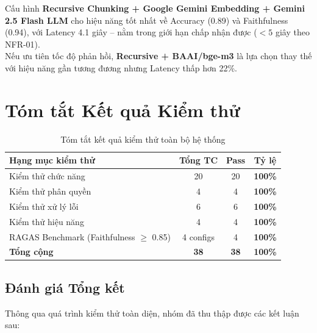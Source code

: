 \begin{tcolorbox}[
  enhanced, colback=green!5!white, colframe=green!60!black,
  fonttitle=\bfseries, title={Kết luận Benchmark -- Cấu hình Tối ưu}
]
  Cấu hình \textbf{Recursive Chunking + Google Gemini Embedding + Gemini 2.5 Flash LLM} cho hiệu năng tốt nhất về Accuracy (0.89) và Faithfulness (0.94), với Latency 4.1 giây -- nằm trong giới hạn chấp nhận được ($< 5$ giây theo NFR-01). \\[4pt]
  Nếu ưu tiên tốc độ phản hồi, \textbf{Recursive + BAAI/bge-m3} là lựa chọn thay thế với hiệu năng gần tương đương nhưng Latency thấp hơn 22\%.
\end{tcolorbox}

\section{Tóm tắt Kết quả Kiểm thử}

\begin{table}[H]
  \centering
  \caption{Tóm tắt kết quả kiểm thử toàn bộ hệ thống}
  \label{tab:test-summary}
  \renewcommand{\arraystretch}{1.5}
  \begin{tabularx}{\textwidth}{|l|c|c|c|}
    \hline
    \rowcolor{blue!10}
    \textbf{Hạng mục kiểm thử} & \textbf{Tổng TC} & \textbf{Pass} & \textbf{Tỷ lệ} \\
    \hline
    Kiểm thử chức năng & 20 & 20 & \textbf{100\%} \\
    \hline
    Kiểm thử phân quyền & 4 & 4 & \textbf{100\%} \\
    \hline
    Kiểm thử xử lý lỗi & 6 & 6 & \textbf{100\%} \\
    \hline
    Kiểm thử hiệu năng & 4 & 4 & \textbf{100\%} \\
    \hline
    RAGAS Benchmark (Faithfulness $\geq$ 0.85) & 4 configs & 4 & \textbf{100\%} \\
    \hline
    \rowcolor{green!10}
    \textbf{Tổng cộng} & \textbf{38} & \textbf{38} & \textbf{100\%} \\
    \hline
  \end{tabularx}
\end{table}

\subsection{Đánh giá Tổng kết}

Thông qua quá trình kiểm thử toàn diện, nhóm đã thu thập được các kết luận sau:

